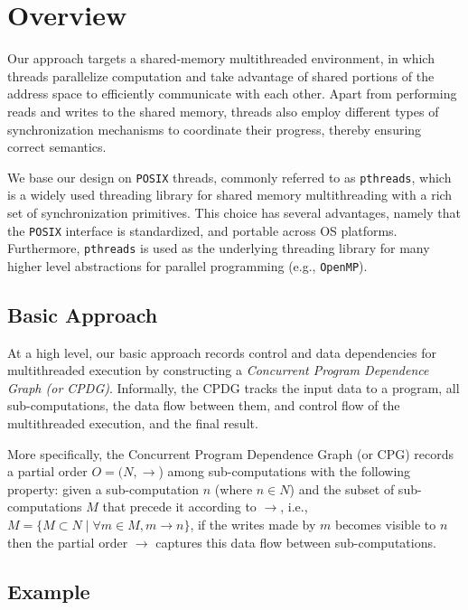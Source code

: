 \section{Overview}
\label{sec:overview}

Our approach targets a shared-memory multithreaded environment, in which threads parallelize computation and take 
advantage of shared portions of the address space to efficiently communicate with each other. Apart from performing reads 
and writes to the shared memory, threads also employ different types of synchronization mechanisms to 
coordinate their progress, thereby ensuring correct semantics. 

We base our design on {\tt POSIX} threads, commonly referred to as
{\tt pthreads}, which is a widely used threading library for shared memory
multithreading with a rich set of synchronization primitives.  This
choice has several advantages, namely that the {\tt POSIX} interface
is standardized, and portable across OS platforms. Furthermore, {\tt pthreads} is used as the underlying threading library for many higher level abstractions for parallel programming
(e.g., {\tt OpenMP}).


\subsection{Basic Approach}

At a high level, our basic approach records control and data dependencies for multithreaded execution by constructing a {\em Concurrent Program Dependence Graph (or CPDG)}. Informally, the CPDG tracks the input data to a program, all sub-computations, the data flow between them, and control flow of the multithreaded execution, and the final result. 

More specifically, the Concurrent Program Dependence Graph (or CPG) records a partial order $O = (N, \rightarrow$) among sub-computations with the following property: given a sub-computation $n$ (where $n \in N $)  and the subset of sub-computations $M$ that precede it according to $\rightarrow$, i.e., $M = \{M \subset N \mid \forall m \in M, m \rightarrow n\}$, if the writes made by $m$ becomes visible to $n$ then the partial order $\rightarrow$ captures this data flow between sub-computations.




\subsection{Example}

